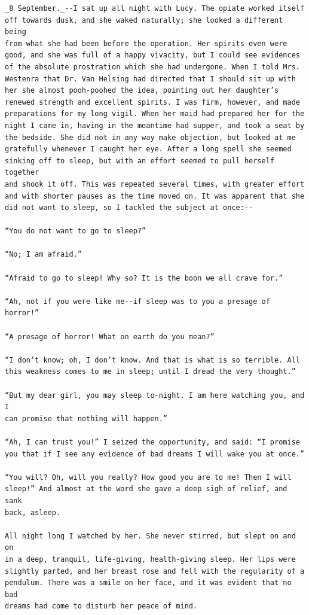 \documentclass{article}
\begin{document}
\begin{verbatim}
_8 September._--I sat up all night with Lucy. The opiate worked itself
off towards dusk, and she waked naturally; she looked a different being
from what she had been before the operation. Her spirits even were
good, and she was full of a happy vivacity, but I could see evidences
of the absolute prostration which she had undergone. When I told Mrs.
Westenra that Dr. Van Helsing had directed that I should sit up with
her she almost pooh-poohed the idea, pointing out her daughter’s
renewed strength and excellent spirits. I was firm, however, and made
preparations for my long vigil. When her maid had prepared her for the
night I came in, having in the meantime had supper, and took a seat by
the bedside. She did not in any way make objection, but looked at me
gratefully whenever I caught her eye. After a long spell she seemed
sinking off to sleep, but with an effort seemed to pull herself together
and shook it off. This was repeated several times, with greater effort
and with shorter pauses as the time moved on. It was apparent that she
did not want to sleep, so I tackled the subject at once:--

“You do not want to go to sleep?”

“No; I am afraid.”

“Afraid to go to sleep! Why so? It is the boon we all crave for.”

“Ah, not if you were like me--if sleep was to you a presage of horror!”

“A presage of horror! What on earth do you mean?”

“I don’t know; oh, I don’t know. And that is what is so terrible. All
this weakness comes to me in sleep; until I dread the very thought.”

“But my dear girl, you may sleep to-night. I am here watching you, and I
can promise that nothing will happen.”

“Ah, I can trust you!” I seized the opportunity, and said: “I promise
you that if I see any evidence of bad dreams I will wake you at once.”

“You will? Oh, will you really? How good you are to me! Then I will
sleep!” And almost at the word she gave a deep sigh of relief, and sank
back, asleep.

All night long I watched by her. She never stirred, but slept on and on
in a deep, tranquil, life-giving, health-giving sleep. Her lips were
slightly parted, and her breast rose and fell with the regularity of a
pendulum. There was a smile on her face, and it was evident that no bad
dreams had come to disturb her peace of mind.


\end{verbatim}
\end{document}
